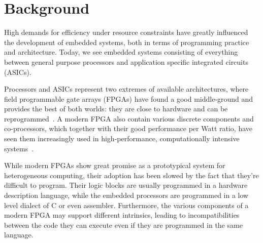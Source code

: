 \documentclass[../main.tex]{subfiles}
\begin{document}
\chapter{Background}
\label{background}

High demands for efficiency under resource constraints have greatly influenced the development of embedded systems, both in terms of programming practice and architecture. Today, we see embedded systems consisting of everything between general purpose processors and application specific integrated circuits (ASICs).


Processors and ASICs represent two extremes of available architectures, where field programmable gate arrays (FPGAs) have found a good middle-ground and provides the best of both worlds: they are close to hardware and can be reprogrammed~\cite{bacon2013}. A modern FPGA also contain various discrete components and co-processors, which together with their good performance per Watt ratio, have seen them increasingly used in high-performance, computationally intensive systems~\cite{mcmillan2014}.


While modern FPGAs show great promise as a prototypical system for heterogeneous computing, their adoption has been slowed by the fact that they're difficult to program. Their logic blocks are usually programmed in a hardware description language, while the embedded processors are programmed in a low level dialect of C or even assembler. Furthermore, the various components of a modern FPGA may support different intrinsics, leading to incompatibilities between the code they can execute even if they are programmed in the same language.


\end{document}
